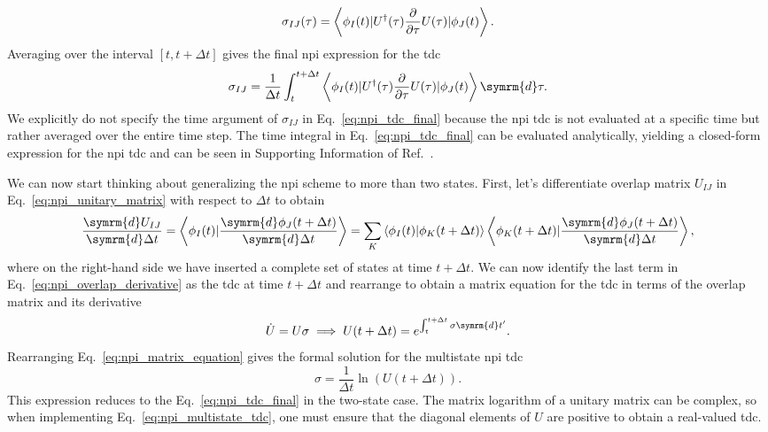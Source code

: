 \begin{equation}\label{eq:npi_overlap}
\sigma_{IJ}(\tau)=\Braket{\phi_I(t)\vert U^\dagger(\tau)\frac{\partial}{\partial\tau}U(\tau)\vert\phi_J(t)}.
\end{equation}
Averaging over the interval $[t,t+\Delta t]$ gives the final \gls{npi} expression for the \gls{tdc}
\begin{equation}\label{eq:npi_tdc_final}
\sigma_{IJ}=\frac{1}{\Delta t}\int_t^{t+\Delta t}\Braket{\phi_I(t)\vert U^\dagger(\tau)\frac{\partial}{\partial\tau}U(\tau)\vert\phi_J(t)}\symrm{d}\tau.
\end{equation}
We explicitly do not specify the time argument of $\sigma_{IJ}$ in Eq.~\eqref{eq:npi_tdc_final} because the \gls{npi} \gls{tdc} is not evaluated at a specific time but rather averaged over the entire time step. The time integral in Eq.~\eqref{eq:npi_tdc_final} can be evaluated analytically, yielding a closed-form expression for the \gls{npi} \gls{tdc} and can be seen in Supporting Information of Ref.~\cite{10.1021/jz5009449}.

We can now start thinking about generalizing the \gls{npi} scheme to more than two states. First, let's differentiate overlap matrix $U_{IJ}$ in Eq.~\eqref{eq:npi_unitary_matrix} with respect to $\Delta t$ to obtain
\begin{equation}\label{eq:npi_overlap_derivative}
\frac{\symrm{d}U_{IJ}}{\symrm{d}\Delta t}=\Braket{\phi_I(t)\vert\frac{\symrm{d}\phi_J(t+\Delta t)}{\symrm{d}\Delta t}}=\sum_K\Braket{\phi_I(t)\vert\phi_K(t+\Delta t)}\Braket{\phi_K(t+\Delta t)\vert\frac{\symrm{d}\phi_J(t+\Delta t)}{\symrm{d}\Delta t}},
\end{equation}
where on the right-hand side we have inserted a complete set of states at time $t+\Delta t$. We can now identify the last term in Eq.~\eqref{eq:npi_overlap_derivative} as the \gls{tdc} at time $t+\Delta t$ and rearrange to obtain a matrix equation for the \gls{tdc} in terms of the overlap matrix and its derivative
\begin{equation}\label{eq:npi_matrix_equation}
\dot U=U\sigma\implies U(t+\Delta t)=e^{\int_t^{t+\Delta t}\sigma\symrm{d}t'}.
\end{equation}
Rearranging Eq.~\eqref{eq:npi_matrix_equation} gives the formal solution for the multistate \gls{npi} \gls{tdc}
\begin{equation}\label{eq:npi_multistate_tdc}
\sigma=\frac{1}{\Delta t}\ln\left(U(t+\Delta t)\right).
\end{equation}
This expression reduces to the Eq.~\eqref{eq:npi_tdc_final} in the two-state case. The matrix logarithm of a unitary matrix can be complex, so when implementing Eq.~\eqref{eq:npi_multistate_tdc}, one must ensure that the diagonal elements of $U$ are positive to obtain a real-valued \gls{tdc}.

